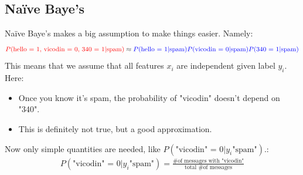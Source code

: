 \documentclass{article}
\theoremstyle{definition}
\begin{document}
\subsection*{Naïve Baye's}
Naïve Baye's makes a {\color{red} big assumption} to make things easier. Namely:
\begin{align*}
{\color{red} P(\text{hello = 1, vicodin = 0, 340 = 1} | \text{spam})} \approx {\color{blue}P(\text{hello = 1} | \text{spam})P(\text{vicodin = 0} | \text{spam})P(\text{340 = 1} | \text{spam})}
\end{align*}
This means that we assume that all features $ x_i $ are {\color{blue} independent given label $ y_i $}. Here:
\begin{itemize}
	\item Once you know it's spam, the probability of "vicodin" doesn't depend on "340".
	\item This is definitely not true, but a good approximation.
\end{itemize}
{\color{OliveGreen} Now only simple quantities are needed, like $ P(\text{"vicodin" = 0} | y_i\text{"spam"}) $.}:
{\color{blue}
	\begin{align*}
	P(\text{"vicodin" = 0} | y_i\text{"spam"}) = \frac{\text{\# of messages with "vicodin"}}{\text{total \# of messages}}
\end{align*}}
\end{document}
